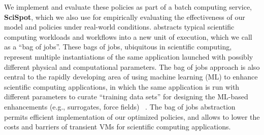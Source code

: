 We implement and evaluate these policies as part of a batch computing service, \textbf{SciSpot}, which we also use for empirically evaluating the effectiveness of our model and policies under real-world conditions. 
%
\sysname abstracts typical scientific computing workloads and workflows into a new unit of execution, which we call as a ``bag of jobs''. 
These bags of jobs, ubiquitous in scientific computing, represent multiple instantiations of the same application launched with possibly different physical and computational parameters.
The bag of jobs approach is also central to the rapidly developing area of using machine learning (ML) to enhance scientific computing applications, in which the same application is run with different parameters to curate ``training data sets'' for designing the ML-based enhancements (e.g., surrogates, force fields) ~\cite{kadupitiya2019machine,kadupitiya2020machine2,moradzadeh2019molecular,fox2019learning,wang2019machine,casalino2021ai,kadupitiya2020machine}.
%
The bag of jobs abstraction permits efficient implementation of our optimized policies, and allows \sysname to lower the costs and barriers of transient VMs for scientific computing applications.


